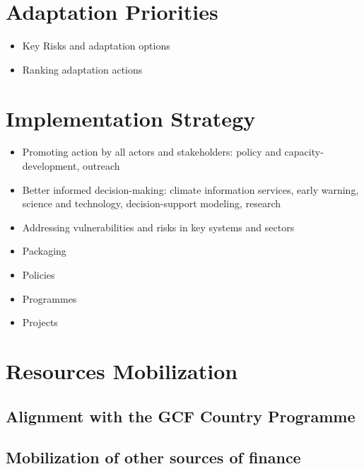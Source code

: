 \documentclass[
]{book}
\providecommand{\tightlist}{%
  \setlength{\itemsep}{0pt}\setlength{\parskip}{0pt}}
\begin{document}
\hypertarget{adaptation-priorities}{%
\section{Adaptation Priorities}\label{adaptation-priorities}}

\begin{itemize}
\tightlist
\item
  Key Risks and adaptation options
\item
  Ranking adaptation actions
\end{itemize}

\hypertarget{implementation-strategy}{%
\section{Implementation Strategy}\label{implementation-strategy}}

\begin{itemize}
\item
  Promoting action by all actors and stakeholders: policy and capacity-development, outreach
\item
  Better informed decision-making: climate information services, early warning, science and technology, decision-support modeling, research
\item
  Addressing vulnerabilities and risks in key systems and sectors
\item
  Packaging
\item
  Policies
\item
  Programmes
\item
  Projects
\end{itemize}

\hypertarget{resources-mobilization}{%
\section{Resources Mobilization}\label{resources-mobilization}}

\hypertarget{alignment-with-the-gcf-country-programme}{%
\subsection{Alignment with the GCF Country Programme}\label{alignment-with-the-gcf-country-programme}}

\hypertarget{mobilization-of-other-sources-of-finance}{%
\subsection{Mobilization of other sources of finance}\label{mobilization-of-other-sources-of-finance}}
\end{document}
